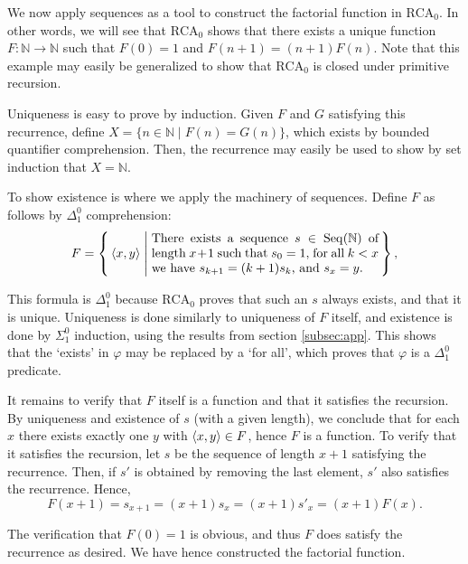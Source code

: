 \documentclass{article}
\theoremstyle{nonumberplain}
\newcommand{\N}{\mathbb{N}}
\newcommand{\RCA}{\mathrm{RCA}}
\newcommand{\Seq}{\mathrm{Seq}}
\DeclarePairedDelimiter{\braket}{\langle}{\rangle}
\begin{document}
We now apply sequences as a tool to construct the factorial function in $\RCA_0$. In other words, we will see that $\RCA_0$ shows that there exists a unique function $F \colon \N \to \N$ such that $F(0) = 1$ and $F(n+1) = (n+1) F(n)$. Note that this example may easily be generalized to show that $\RCA_0$ is closed under primitive recursion.

Uniqueness is easy to prove by induction. Given $F$ and $G$ satisfying this recurrence, define $X = \{n \in \N \mid F(n) = G(n)\}$, which exists by bounded quantifier comprehension. Then, the recurrence may easily be used to show by set induction that $X = \N$.

To show existence is where we apply the machinery of sequences. Define $F$ as follows by $\Delta^0_1$ comprehension:
\begin{equation}
F = \left\{\, \braket{x,y} \;\middle|\; \parbox{18em}{There exists a sequence $s \in \Seq(\N)$ of length $x+1$ such that $s_0 = 1$, for all $k<x$ we have $s_{k+1} = (k+1) s_k$, and  $s_x = y$.} \,\right\},
\end{equation}

This formula is $\Delta^0_1$ because $\RCA_0$ proves that such an $s$ always exists, and that it is unique. Uniqueness is done similarly to uniqueness of $F$ itself, and existence is done by $\Sigma^0_1$ induction, using the results from section \ref{subsec:app}. This shows that the `exists' in $\varphi$ may be replaced by a `for all', which proves that $\varphi$ is a $\Delta^0_1$ predicate.

It remains to verify that $F$ itself is a function and that it satisfies the recursion. By uniqueness and existence of $s$ (with a given length), we conclude that for each $x$ there exists exactly one $y$ with $\braket{x,y} \in F$, hence $F$ is a function. To verify that it satisfies the recursion, let $s$ be the sequence of length $x+1$ satisfying the recurrence. Then, if $s'$ is obtained by removing the last element, $s'$ also satisfies the recurrence. Hence,
\begin{equation}
F(x+1) = s_{x+1} = (x+1) s_x = (x+1) s'_x = (x+1) F(x).
\end{equation}

The verification that $F(0) = 1$ is obvious, and thus $F$ does satisfy the recurrence as desired. We have hence constructed the factorial function.





\end{document}
